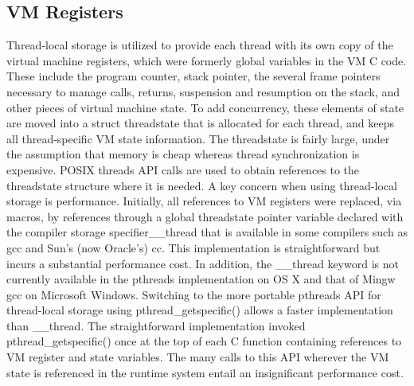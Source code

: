 \subsection{VM Registers}
Thread-local storage is utilized to provide each thread with its own copy of the virtual
machine registers, which were formerly global variables in the VM C code. These include
the program counter, stack pointer, the several frame pointers necessary to manage calls,
returns, suspension and resumption on the stack, and other pieces of virtual machine state.
To add concurrency, these elements of state are moved into a struct threadstate that is
allocated for each thread, and keeps all thread-specific VM state information.
The threadstate is fairly large, under the assumption that memory is cheap whereas
thread synchronization is expensive. POSIX threads API calls are used to obtain references
to the threadstate structure where it is needed.
A key concern when using thread-local storage is performance. Initially, all references to
VM registers were replaced, via macros, by references through a global threadstate pointer
variable declared with the compiler storage specifier\_\_thread that is available in some
compilers such as gcc and Sun's (now Oracle's) cc. This implementation is straightforward
but incurs a substantial performance cost. In addition, the \_\_thread keyword is not currently
available in the pthreads implementation on OS X and that of Mingw gcc on Microsoft Windows.
Switching to the more portable pthreads API for thread-local storage using pthread\_getspecific()
allows a faster implementation than \_\_thread. The straightforward implementation
invoked pthread\_getspecific() once at the top of each C function containing references to
VM register and state variables. The many calls to this API wherever the VM state is referenced
in the runtime system entail an insignificant performance cost.

